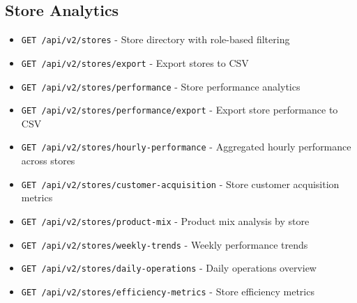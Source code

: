 \documentclass[11pt,a4paper]{article}
\begin{document}
\subsection{Store Analytics}
\begin{itemize}[leftmargin=*]
    \item \texttt{GET /api/v2/stores} - Store directory with role-based filtering
    \item \texttt{GET /api/v2/stores/export} - Export stores to CSV
    \item \texttt{GET /api/v2/stores/performance} - Store performance analytics
    \item \texttt{GET /api/v2/stores/performance/export} - Export store performance to CSV
    \item \texttt{GET /api/v2/stores/hourly-performance} - Aggregated hourly performance across stores
    \item \texttt{GET /api/v2/stores/customer-acquisition} - Store customer acquisition metrics
    \item \texttt{GET /api/v2/stores/product-mix} - Product mix analysis by store
    \item \texttt{GET /api/v2/stores/weekly-trends} - Weekly performance trends
    \item \texttt{GET /api/v2/stores/daily-operations} - Daily operations overview
    \item \texttt{GET /api/v2/stores/efficiency-metrics} - Store efficiency metrics
\end{itemize}
\end{document}
